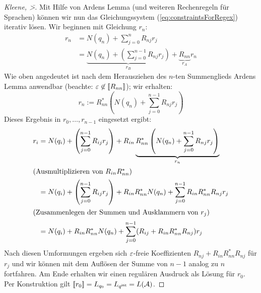 {\begin{proof}[Kleene, \=>]
  Mit Hilfe von Ardens Lemma (und weiteren Rechenregeln für Sprachen) können wir nun das Gleichungssystem (\ref{eq:constraintsForRegex}) iterativ lösen.
    Wir beginnen mit Gleichung $r_n$:
    \begin{align*}
      r_n &= N(q_n) + \sum_{j = 0}^n R_{nj} r_j \\
          &= \underbrace{N(q_n) + \left (\sum_{j = 0}^{n-1} R_{nj} r_j \right)}_{r_B} + \underbrace{R_{nn}}_{r_A} r_n
    \end{align*}
    Wie oben angedeutet ist nach dem Herausziehen des $n$-ten Summenglieds Ardens Lemma anwendbar (beachte: $\varepsilon \not \in [\![ R_{nn} ]\!]$); wir erhalten:
    \begin{displaymath}
      r_n := R_{nn}^*\left(N(q_n) + \sum_{j = 0}^{n-1} R_{nj} r_j  \right)
    \end{displaymath}
    Dieses Ergebnis in $r_0,\ldots,r_{n-1}$ eingesetzt ergibt:
    \begin{align*}
      r_i &= N(q_i) + \left (\sum_{j = 0}^{n-1} R_{ij} r_j \right) + R_{in} \underbrace{R_{nn}^*\left(N(q_n) + \sum_{j = 0}^{n-1} R_{nj} r_j  \right)}_{r_n} \\
      \intertext{(Ausmultiplizieren von $R_{in}R_{nn}^*$)}
          &= N(q_i) + \left (\sum_{j = 0}^{n-1} R_{ij} r_j \right) + R_{in}R_{nn}^*N(q_n) + \sum_{j = 0}^{n-1} R_{in}R_{nn}^*R_{nj} r_j  \\
      \intertext{(Zusammenlegen der Summen und Ausklammern von $r_j$)}
          &= N(q_i) + R_{in}R_{nn}^*N(q_n) + \sum_{j = 0}^{n-1} (R_{ij} + R_{in}R_{nn}^*R_{nj}) r_j
    \end{align*}
  Nach diesen Umformungen ergeben sich $\varepsilon$-freie Koeffizienten $R_{nj} + R_{in}R_{nn}^*R_{nj}$ für $r_j$ und wir können mit dem Auflösen der Summe von $n-1$ analog zu $n$ fortfahren.
  Am Ende erhalten wir einen regulären Ausdruck als Lösung für $r_0$.
  Per Konstruktion gilt $[\![ r_0 ]\!] = L_{q_0} = L_{q^\mathsf{init}} = L(\mathcal{A})$.
  \end{proof}
    

}
